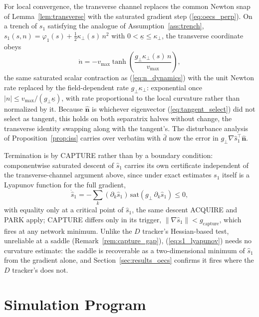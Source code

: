 \documentclass[lettersize,journal]{IEEEtran}
\begin{document}
For local convergence, the transverse channel replaces the common
Newton snap of Lemma~\ref{lem:transverse} with the saturated gradient
step (\ref{eq:oecs_perp}). On a trench of $s_1$ satisfying the analogue
of Assumption~\ref{ass:trench}, $s_1(s, n) = \varphi_1(s) +
\tfrac{1}{2}\kappa_\perp(s)\,n^2$ with $0 < \underline{\kappa} \leq
\kappa_\perp$, the transverse coordinate obeys
\begin{equation}
    \dot{n} = -v_{\max}\tanh\!\left(
    \frac{g_\perp \kappa_\perp(s)\,n}{v_{\max}}\right),
    \label{eq:oecs_n_dynamics}
\end{equation}
the same saturated scalar contraction as (\ref{eq:n_dynamics}) with the
unit Newton rate replaced by the field-dependent rate $g_\perp
\kappa_\perp$: exponential once $|n| \leq v_{\max}/(g_\perp
\underline{\kappa})$, with rate proportional to the local curvature
rather than normalized by it. Because $\hat{\mathbf{n}}$ is whichever
eigenvector (\ref{eq:tangent_select}) did not select as tangent, this
holds on both separatrix halves without change, the transverse identity
swapping along with the tangent's. The disturbance analysis of
Proposition~\ref{prop:iss} carries over verbatim with $\bar{d}$ now the
error in $g_\perp \nabla\hat{s}_1^\top\hat{\mathbf{n}}$.

Termination is by CAPTURE rather than by a boundary condition:
componentwise saturated descent of $\hat{s}_1$ carries its own
certificate independent of the transverse-channel argument above,
since under exact estimates $s_1$ itself is a Lyapunov function for the
full gradient,
\begin{equation}
    \dot{\hat{s}}_1 = -\sum_k (\partial_k \hat{s}_1)\,
    \mathrm{sat}(g_\perp\,\partial_k \hat{s}_1) \leq 0,
    \label{eq:s1_lyapunov}
\end{equation}
with equality only at a critical point of $\hat{s}_1$, the same descent
ACQUIRE and PARK apply; CAPTURE differs only in its trigger,
$\lVert\nabla\hat{s}_1\rVert < g_{\text{capture}}$, which fires at any
network minimum. Unlike the $D$ tracker's Hessian-based test, unreliable
at a saddle (Remark~\ref{rem:capture_gap}), (\ref{eq:s1_lyapunov}) needs
no curvature estimate: the saddle is recoverable as a two-dimensional
minimum of $\hat{s}_1$ from the gradient alone, and
Section~\ref{sec:results_oecs} confirms it fires where the $D$ tracker's
does not.

\section{Simulation Program}
\label{sec:methods}
\end{document}
